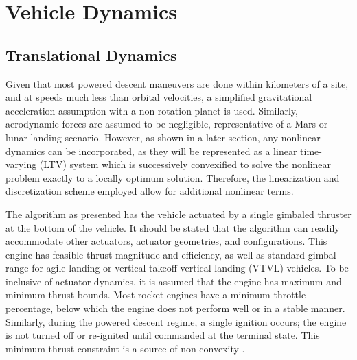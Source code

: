 \documentclass[conf]{new-aiaa}
\begin{document}
\section{Vehicle Dynamics}
\subsection{Translational Dynamics}
Given that most powered descent maneuvers are done within kilometers of a site, and at speeds much less than orbital velocities, a simplified gravitational acceleration assumption with a non-rotation planet is used. Similarly, aerodynamic forces are assumed to be negligible, representative of a Mars or lunar landing scenario. However, as shown in a later section, any nonlinear dynamics can be incorporated, as they will be represented as a linear time-varying (LTV) system which is successively convexified to solve the nonlinear problem exactly to a locally optimum solution. Therefore, the linearization and discretization scheme employed allow for additional nonlinear terms. 

The algorithm as presented has the vehicle actuated by a single gimbaled thruster at the bottom of the vehicle. It should be stated that the algorithm can readily accommodate other actuators, actuator geometries, and configurations. This engine has feasible thrust magnitude and efficiency, as well as standard gimbal range for agile landing or vertical-takeoff-vertical-landing (VTVL) vehicles. To be inclusive of actuator dynamics, it is assumed that the engine has maximum and minimum thrust bounds. Most rocket engines have a minimum throttle percentage, below which the engine does not perform well or in a stable manner. Similarly, during the powered descent regime, a single ignition occurs; the engine is not turned off or re-ignited until commanded at the terminal state. This minimum thrust constraint is a source of non-convexity \cite{accikmecse2011lossless}.
\end{document}
